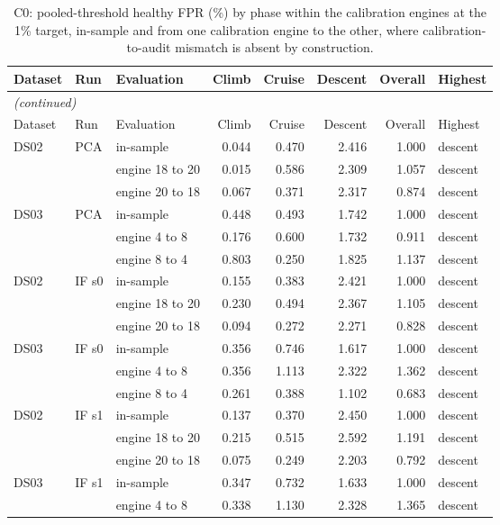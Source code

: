 \begin{scriptsize}
\begin{longtable}{lllrrrrl}
\caption{C0: pooled-threshold healthy FPR (\%) by phase within the calibration engines at the 1\% target, in-sample and from one calibration engine to the other, where calibration-to-audit mismatch is absent by construction.}\label{tab:s22_c0}\\
\toprule
Dataset & Run & Evaluation & Climb & Cruise & Descent & Overall & Highest \\
\midrule
\endfirsthead
\multicolumn{8}{l}{\emph{(continued)}}\\
\toprule
Dataset & Run & Evaluation & Climb & Cruise & Descent & Overall & Highest \\
\midrule
\endhead
\bottomrule
\endfoot
DS02 & PCA & in-sample & 0.044 & 0.470 & 2.416 & 1.000 & descent \\
 &  & engine 18 to 20 & 0.015 & 0.586 & 2.309 & 1.057 & descent \\
 &  & engine 20 to 18 & 0.067 & 0.371 & 2.317 & 0.874 & descent \\
\midrule
DS03 & PCA & in-sample & 0.448 & 0.493 & 1.742 & 1.000 & descent \\
 &  & engine 4 to 8 & 0.176 & 0.600 & 1.732 & 0.911 & descent \\
 &  & engine 8 to 4 & 0.803 & 0.250 & 1.825 & 1.137 & descent \\
\midrule
DS02 & IF s0 & in-sample & 0.155 & 0.383 & 2.421 & 1.000 & descent \\
 &  & engine 18 to 20 & 0.230 & 0.494 & 2.367 & 1.105 & descent \\
 &  & engine 20 to 18 & 0.094 & 0.272 & 2.271 & 0.828 & descent \\
\midrule
DS03 & IF s0 & in-sample & 0.356 & 0.746 & 1.617 & 1.000 & descent \\
 &  & engine 4 to 8 & 0.356 & 1.113 & 2.322 & 1.362 & descent \\
 &  & engine 8 to 4 & 0.261 & 0.388 & 1.102 & 0.683 & descent \\
\midrule
DS02 & IF s1 & in-sample & 0.137 & 0.370 & 2.450 & 1.000 & descent \\
 &  & engine 18 to 20 & 0.215 & 0.515 & 2.592 & 1.191 & descent \\
 &  & engine 20 to 18 & 0.075 & 0.249 & 2.203 & 0.792 & descent \\
\midrule
DS03 & IF s1 & in-sample & 0.347 & 0.732 & 1.633 & 1.000 & descent \\
 &  & engine 4 to 8 & 0.338 & 1.130 & 2.328 & 1.365 & descent \\

\end{longtable}
\end{scriptsize}
